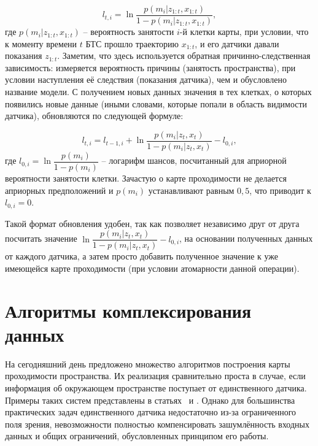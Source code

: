\begin{equation}
	l_{t,i} = \ln\dfrac{p(m_i|z_{1:t}, x_{1:t})}{1 - p(m_i|z_{1:t}, x_{1:t})},
	\label{eq:log_odds}
\end{equation}
где $p(m_i|z_{1:t}, x_{1:t})$ -- вероятность занятости $i$-й клетки карты, при условии, что к моменту времени $t$ БТС прошло траекторию $x_{1:t}$, и его датчики давали показания $z_{1:t}$. Заметим, что здесь используется обратная причинно-следственная зависимость: измеряется вероятность причины (занятость пространства), при условии наступления её следствия (показания датчика), чем и обусловлено название модели. С получением новых данных значения в тех клетках, о которых появились новые данные (иными словами, которые попали в область видимости датчика), обновляются по следующей формуле:

\begin{equation}
	l_{t,i} = l_{t-1,i} + \ln\dfrac{p(m_i|z_t, x_t)}{1 - p(m_i|z_t, x_t)} - l_{0,i},
	\label{eq:log_odd_upd}
\end{equation}
где $l_{0,i} = \ln\dfrac{p(m_i)}{1 - p(m_i)}$ -- логарифм шансов, посчитанный для априорной вероятности занятости клетки. Зачастую о карте проходимости не делается априорных предположений и $p(m_i)$ устанавливают равным $0,5$, что приводит к $l_{0,i} = 0$. 

Такой формат обновления удобен, так как позволяет независимо друг от друга посчитать значение $\ln\dfrac{p(m_i|z_t, x_t)}{1 - p(m_i|z_t, x_t)} - l_{0,i}$, на основании полученных данных от каждого датчика, а затем просто добавить полученное значение к уже имеющейся карте проходимости (при условии атомарности данной операции). 


\section{Алгоритмы комплексирования данных}\label{sec:ch1/fusion}

На сегодняшний день предложено множество алгоритмов построения карты проходимости пространства. Их реализация сравнительно проста в случае, если информация об окружающем пространстве поступает от единственного датчика. Примеры таких систем представлены в статьях~\autocite{wang2018single} и \autocite{luo2019probability}. Однако для большинства практических задач единственного датчика недостаточно из-за ограниченного поля зрения, невозможности полностью компенсировать зашумлённость входных данных и общих ограничений, обусловленных принципом его работы.

